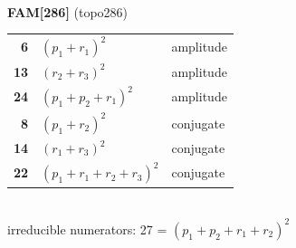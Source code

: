 \documentclass[10pt]{article}
\begin{document}
\begin{minipage}[t]{0.48\textwidth}
{}\\[2mm]\textbf{FAM[286]} (topo286)\\[2pt]{\footnotesize\begin{tabular}{@{}r@{\ \ }l@{\ \ }l@{}}\textbf{6} & $(p_1+r_1)^2$ & amplitude\\
\textbf{13} & $(r_2+r_3)^2$ & amplitude\\
\textbf{24} & $(p_1+p_2+r_1)^2$ & amplitude\\
\textbf{8} & $(p_1+r_2)^2$ & conjugate\\
\textbf{14} & $(r_1+r_3)^2$ & conjugate\\
\textbf{22} & $(p_1+r_1+r_2+r_3)^2$ & conjugate\\\end{tabular}}\\[2pt]{\scriptsize irreducible numerators: 27 = $(p_1+p_2+r_1+r_2)^2$}\end{minipage}\hfill%
\end{document}
